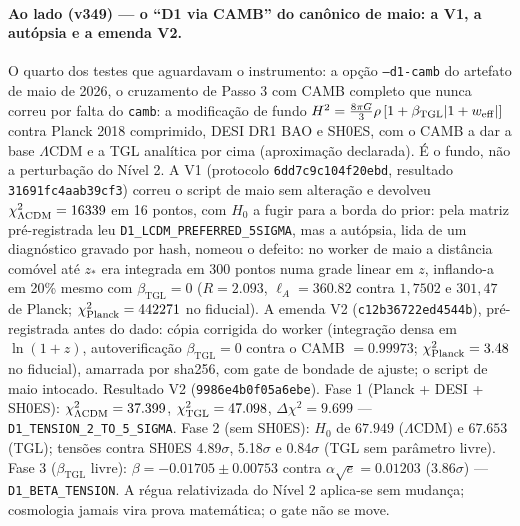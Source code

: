 \documentclass[11pt]{article}
\newcommand{\bTGL}{\beta_{\mathrm{TGL}}}\newcommand{\Msun}{M_{\odot}}\newcommand{\TGL}{\mathrm{TGL}}
\theoremstyle{definition}\newtheorem{deriv}{Derivação}
\begin{document}
\paragraph*{Ao lado (v349) --- o ``D1 via CAMB'' do canônico de maio: a V1, a autópsia e a emenda V2.} O quarto dos testes que aguardavam o instrumento: a opção \texttt{--d1-camb} do artefato de maio de 2026, o cruzamento de Passo 3 com CAMB completo que nunca correu por falta do \texttt{camb}: a modificação de fundo $H^2=\tfrac{8\pi G}{3}\rho\,[1+\bTGL|1+w_{\rm eff}|]$ contra Planck 2018 comprimido, DESI DR1 BAO e SH0ES, com o CAMB a dar a base $\Lambda$CDM e a TGL analítica por cima (aproximação declarada). É o fundo, não a perturbação do Nível 2. A V1 (protocolo \texttt{6dd7c9c104f20ebd}, resultado \texttt{31691fc4aab39cf3}) correu o script de maio sem alteração e devolveu $\chi^2_{\Lambda{\rm CDM}}=16339$ em 16 pontos, com $H_0$ a fugir para a borda do prior: pela matriz pré-registrada leu \texttt{D1\_LCDM\_PREFERRED\_5SIGMA}, mas a autópsia, lida de um diagnóstico gravado por hash, nomeou o defeito: no worker de maio a distância comóvel até $z_\ast$ era integrada em 300 pontos numa grade linear em $z$, inflando-a em 20\% mesmo com $\bTGL=0$ ($R=2.093$, $\ell_A=360.82$ contra $1{,}7502$ e $301{,}47$ de Planck; $\chi^2_{\rm Planck}=442271$ no fiducial). A emenda V2 (\texttt{c12b36722ed4544b}), pré-registrada antes do dado: cópia corrigida do worker (integração densa em $\ln(1+z)$, autoverificação $\bTGL=0$ contra o CAMB $=0.99973$; $\chi^2_{\rm Planck}=3.48$ no fiducial), amarrada por sha256, com gate de bondade de ajuste; o script de maio intocado. Resultado V2 (\texttt{9986e4b0f05a6ebe}). Fase 1 (Planck + DESI + SH0ES): $\chi^2_{\Lambda{\rm CDM}}=37.399$, $\chi^2_{\rm TGL}=47.098$, $\Delta\chi^2=9.699$ --- \texttt{D1\_TENSION\_2\_TO\_5\_SIGMA}. Fase 2 (sem SH0ES): $H_0$ de $67.949$ ($\Lambda$CDM) e $67.653$ (TGL); tensões contra SH0ES 4.89$\sigma$, 5.18$\sigma$ e 0.84$\sigma$ (TGL sem parâmetro livre). Fase 3 ($\bTGL$ livre): $\beta=-0.01705\pm0.00753$ contra $\alpha\sqrt e=0.01203$ (3.86$\sigma$) --- \texttt{D1\_BETA\_TENSION}. A régua relativizada do Nível 2 aplica-se sem mudança; cosmologia jamais vira prova matemática; o gate não se move.
\end{document}
